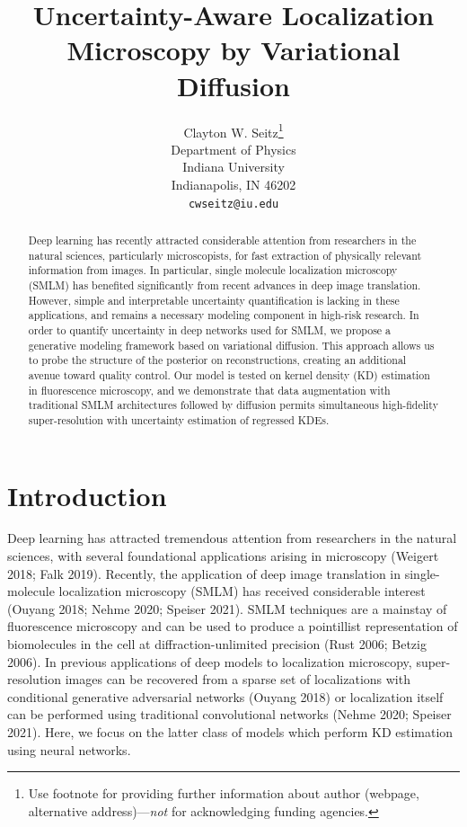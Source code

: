 \documentclass{article}
\title{Uncertainty-Aware Localization Microscopy by Variational Diffusion}
\author{%
  Clayton W. Seitz\thanks{Use footnote for providing further information
    about author (webpage, alternative address)---\emph{not} for acknowledging
    funding agencies.} \\
  Department of Physics\\
  Indiana University\\
  Indianapolis, IN 46202 \\
  \texttt{cwseitz@iu.edu} \\
}
\begin{document}
\maketitle


\begin{abstract}

Deep learning has recently attracted considerable attention from researchers in the natural sciences, particularly microscopists, for fast extraction of physically relevant information from images. In particular, single molecule localization microscopy (SMLM) has benefited significantly from recent advances in deep image translation. However, simple and interpretable uncertainty quantification is lacking in these applications, and remains a necessary modeling component in high-risk research. In order to quantify uncertainty in deep networks used for SMLM, we propose a generative modeling framework based on variational diffusion. This approach allows us to probe the structure of the posterior on reconstructions, creating an additional avenue toward quality control. Our model is tested on kernel density (KD) estimation in fluorescence microscopy, and we demonstrate that data augmentation with traditional SMLM architectures followed by diffusion permits simultaneous high-fidelity super-resolution with uncertainty estimation of regressed KDEs. 
\end{abstract}

\section{Introduction}

Deep learning has attracted tremendous attention from researchers in the natural sciences, with several foundational applications arising in microscopy (Weigert 2018; Falk 2019). Recently, the application of deep image translation in single-molecule localization microscopy (SMLM) has received considerable interest (Ouyang 2018; Nehme 2020; Speiser 2021). SMLM techniques are a mainstay of fluorescence microscopy and can be used to produce a pointillist representation of biomolecules in the cell at diffraction-unlimited precision (Rust 2006; Betzig 2006). In previous applications of deep models to localization microscopy, super-resolution images can be recovered from a sparse set of localizations with conditional generative adversarial networks (Ouyang 2018) or localization itself can be performed using traditional convolutional networks (Nehme 2020; Speiser 2021). Here, we focus on the latter class of models which perform KD estimation using neural networks. 
\end{document}
